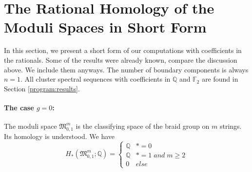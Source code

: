 \section{The Rational Homology of the Moduli Spaces in Short Form}
\label{introduction:more_rational_homology}
In this section, we present a short form of our computations with coefficients in the rationals.
Some of the results were already known, compare the discussion above.
We include them anyways.
The number of boundary components is always $n=1$.
All cluster spectral sequences with coefficients in $\mathbb Q$ and $\mathbb F_2$ are found in Section \ref{program:results}.

\paragraph{The case \texorpdfstring{$g=0$}{g=0}:}
The moduli space $\mathfrak M_{0,1}^m$ is the classifying space of the braid group on $m$ strings.
Its homology is understood.
We have
\[
    H_\ast(\mathfrak M_{0,1}^m; \mathbb Q) =
        \begin{cases}
            \mathbb Q   & \ast = 0 \\
            \mathbb Q   & \ast = 1 \; and\; m \ge 2 \\
            0           & else
        \end{cases}
\]

